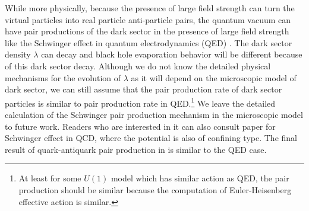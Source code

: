 \documentclass[a4paper,11pt]{article}
\begin{document}
While more physically, because the presence of large field strength can turn the virtual particles into real particle anti-particle pairs, the quantum vacuum can have pair productions of the dark sector in the presence of large field strength like the Schwinger effect in quantum electrodynamics (QED) \cite{Gibbons:1975kk,Schwinger:1951nm}. The dark sector density $\lambda$ can decay and black hole evaporation behavior will be different because of this dark sector decay. Although we do not know the detailed physical mechanisms for the evolution of $\lambda$ as it will depend on the microscopic model of dark sector, we can still assume that the pair production rate of dark sector particles is similar to pair production rate in QED.\footnote{At least for some $U(1)$ model which has similar action as QED, the pair production should be similar because the computation of Euler-Heisenberg effective action is similar.}  We leave the detailed calculation of the Schwinger pair production mechanism in the microscopic  model to future work. Readers who are interested in it can also consult paper \cite{Suganuma:1991ha,Nayak:2005pf} for Schwinger effect in QCD, where the potential is also of confining type. The final result of quark-antiquark pair production in \cite{Suganuma:1991ha,Nayak:2005pf} is similar to the QED case.



\end{document}
